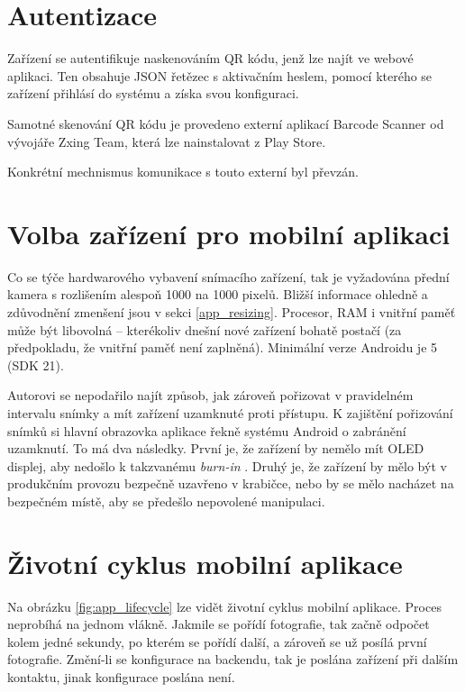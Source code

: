 \section{Autentizace}

\noindent
Zařízení se autentifikuje naskenováním QR kódu, jenž lze najít ve webové aplikaci. Ten obsahuje
JSON řetězec s aktivačním heslem, pomocí kterého se zařízení přihlásí do systému a získa svou konfiguraci.

Samotné skenování QR kódu je provedeno externí aplikací Barcode Scanner od vývojáře
Zxing Team, která lze nainstalovat z Play Store.

Konkrétní mechnismus komunikace s touto externí byl převzán. \citep[viz][]{QrScan}

\section{Volba zařízení pro mobilní aplikaci}

\noindent
Co se týče hardwarového vybavení snímacího zařízení, tak je vyžadována přední kamera
s rozlišením alespoň 1000 na 1000 pixelů. Bližší informace ohledně a zdůvodnění zmenšení jsou v sekci \ref{app_resizing}.
Procesor, RAM i vnitřní paměť může být libovolná -- kterékoliv
dnešní nové zařízení bohatě postačí (za předpokladu, že vnitřní paměť není zaplněná).
Minimální verze Androidu je 5 (SDK 21).

Autorovi se nepodařilo najít způsob, jak zároveň pořizovat v pravidelném intervalu snímky
a mít zařízení uzamknuté proti přístupu. K zajištění pořizování snímků si hlavní
obrazovka aplikace řekně systému Android o zabránění uzamknutí.
To má dva následky. První je, že zařízení by nemělo mít OLED displej, aby nedošlo k takzvanému
\textit{burn-in} \citep[viz][]{OledBurnIn}. Druhý je, že zařízení by mělo být v produkčním provozu
bezpečně uzavřeno v krabičce, nebo by se mělo nacházet na bezpečném místě, aby se předešlo
nepovolené manipulaci.

\section{Životní cyklus mobilní aplikace}

\noindent
Na obrázku \ref{fig:app_lifecycle} lze vidět životní cyklus mobilní aplikace.
Proces neprobíhá na jednom vlákně. Jakmile se pořídí fotografie, tak začně odpočet kolem jedné
sekundy, po kterém se pořídí další, a zároveň se už posílá první fotografie.
Změní-li se konfigurace na backendu, tak je poslána zařízení při dalším kontaktu, jinak
konfigurace poslána není.

